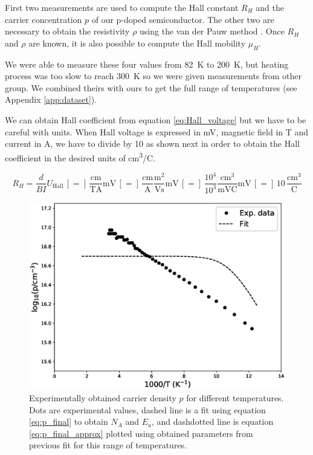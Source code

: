 \documentclass[11pt,a4paper]{article}
\begin{document}
First two measurements are used to compute the Hall constant $R_H$ and the carrier concentration $p$ of our p-doped semiconductor. The other two are necessary to obtain the resistivity $\rho$ using the van der Pauw method \cite{vdP}. Once $R_H$ and $\rho$ are known, it is also possible to compute the Hall mobility $\mu_H$.

We were able to measure these four values from \SI{82}{\kelvin} to \SI{200}{\kelvin}, but heating process was too slow to reach \SI{300}{\kelvin} so we were given measurements from other group. We combined theirs with ours to get the full range of temperatures (see Appendix \ref{app:dataset}).

We can obtain Hall coefficient from equation \eqref{eq:Hall_voltage} but we have to be careful with units. When Hall voltage is expressed in \si{\milli\volt}, magnetic field in \si{\tesla} and current in \si{\ampere}, we have to divide by 10 as shown next in order to obtain the Hall coefficient in the desired units of \si{\centi\meter^3/\coulomb}.

\begin{equation*}
R_H=\frac{d}{BI}U_\text{Hall}\,[=]\,\frac{\si{\centi\meter}}{\si{\tesla\ampere}}\si{\milli\volt}\,[=]\,\frac{\si{\centi\meter}}{\si{\ampere}}\frac{\si{\meter^2}}{\si{\volt\second}}\si{\milli\volt}\,[=]\,\frac{10^4}{10^3}\frac{\si{\centi\meter^3}}{\si{\milli\volt\coulomb}}\si{\milli\volt}\,[=]\,10\,\frac{\si{\centi\meter^3}}{\si{\coulomb}}
\end{equation*}

\begin{figure}[H]
\centering
\includegraphics[width=.8\textwidth]{carrier_density.eps}
\caption{Experimentally obtained carrier density $p$ for different temperatures. Dots are experimental values, dashed line is a fit using equation \eqref{eq:p_final} to obtain $N_A$ and $E_a$, and dashdotted line is equation \eqref{eq:p_final_approx} plotted using obtained parameters from previous fit for this range of temperatures.}
\label{fig:carrier_density}
\end{figure}
\end{document}

